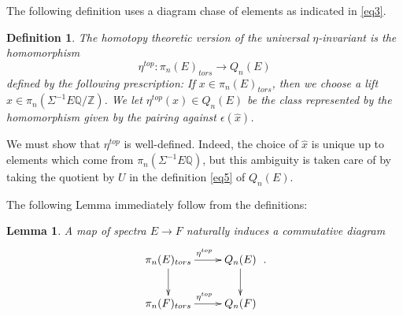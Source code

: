 \documentclass[12pt]{article}
\newtheorem{lem}[theorem]{Lemma}
\newtheorem{ddd}[theorem]{Definition}
\newcommand{\cX}{{\mathcal{X}}}
\newcommand{\Z}{{\mathbb{Z}}}
\newcommand{\Q}{{\mathbb{Q}}}
\newcommand{\tM}{{\tt M}}
\begin{document}
The following definition uses a diagram chase of elements as indicated in \eqref{eq3}.
\begin{ddd}\label{etatopdefv}
The homotopy theoretic version of the universal $\eta$-invariant is  the homomorphism 
$$\eta^{top}:\pi_{n}(E)_{tors}\to Q_{n}(E)$$
defined by the following prescription:
If $x\in \pi_{n}(E)_{tors}$, then we choose a lift
$\hat x\in \pi_{n}(\Sigma^{-1}E\Q/\Z)$. 
We let $\eta^{top}(x)\in Q_{n}(E)$ be the class represented by the homomorphism 
given by the pairing against $\epsilon(\hat x)$.
\end{ddd}

We must show that $\eta^{top}$ is well-defined. Indeed, the choice of $\hat x$ is unique up to elements which come from $\pi_{n}(\Sigma^{-1}E\Q)$, but this ambiguity is taken care of by taking the quotient by $U$ in the definition  \eqref{eq5} of $Q_{n}(E)$.

 The following Lemma immediately follow from the definitions:
\begin{lem}\label{lem1000} A map of spectra $E\to F$   naturally induces a commutative diagram
  $$\xymatrix{\pi_{n}(E)_{tors}\ar[d]\ar[r]^{\eta^{top}}&Q_{n}(E)\ar[d]\\
\pi_{n}(F)_{tors}\ar[r]^{\eta^{top}}&Q_{n}(F)}\ .$$
\end{lem}








%
\end{document}
